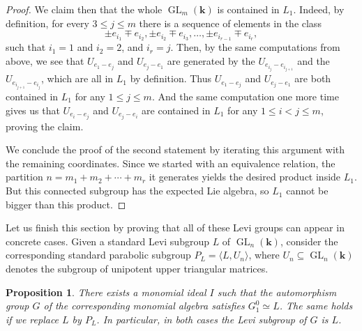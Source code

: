 \documentclass[11pt,letterpaper,reqno]{amsart}
\newtheorem{proposition}[proposition]{Proposition}
\theoremstyle{remark}
\theoremstyle{definition}
\newcommand{\KK}[0]{\ensuremath{\mathbf{k}}}
\newcommand{\GL}[0]{\ensuremath{\operatorname{GL}}}
\begin{document}
\begin{proof}
We claim then that the whole $\GL_m(\KK)$ is contained in $L_1$. Indeed, by definition, for every $3\leq j\leq m$ there is a sequence of elements in the class
$$\pm e_{i_1}\mp e_{i_2},\pm e_{i_2}\mp e_{i_3}, \ldots, \pm e_{i_{r-1}}\mp e_{i_r},$$
such that $i_1=1$ and $i_2=2$, and $i_r=j$. Then, by the same computations from above, we see that $U_{e_1-e_j}$ and $U_{e_j-e_1}$ are generated by the $U_{e_{i_j}-e_{i_{j+1}}}$ and the $U_{e_{i_{j+1}}-e_{i_j}}$, which are all in $L_1$ by definition. Thus $U_{e_1-e_j}$ and $U_{e_j-e_1}$ are both contained in $L_1$ for any $1\leq j\leq m$. And the same computation one more time gives us that $U_{e_i-e_j}$ and $U_{e_j-e_i}$ are contained in $L_1$ for any $1\leq i<j\leq m$, proving the claim.

We conclude the proof of the second statement by iterating this argument with the remaining coordinates. Since we started with an equivalence relation, the partition $n=m_1+m_2+\cdots+m_r$ it generates yields the desired product inside $L_1$. But this connected subgroup has the expected Lie algebra, so $L_1$ cannot be bigger than this product.
\end{proof}

Let us finish this section by proving that all of these Levi groups can appear in concrete cases. Given a standard Levi subgroup $L$ of $\GL_n(\KK)$, consider the corresponding standard parabolic subgroup $P_L=\langle L,U_n\rangle$, where $U_n\subseteq \GL_n(\KK)$ denotes the subgroup of unipotent upper triangular matrices.

\begin{proposition}\label{prop:levi exist}
There exists a monomial ideal $I$ such that the automorphism group $G$ of the corresponding monomial algebra satisfies $G_1^0\simeq L$. The same holds if we replace $L$ by $P_L$. In particular, in both cases the Levi subgroup of $G$ is $L$.
\end{proposition}
\end{document}
